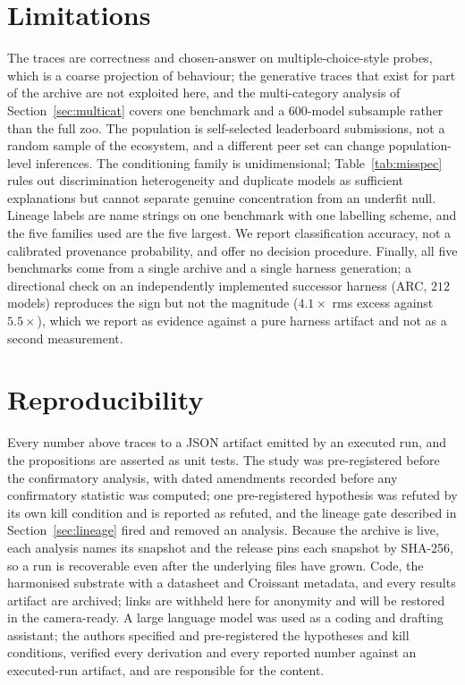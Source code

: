 \documentclass{article}
\begin{document}
\section{Limitations}

The traces are correctness and chosen-answer on multiple-choice-style probes, which is a coarse
projection of behaviour; the generative traces that exist for part of the archive are not exploited
here, and the multi-category analysis of Section~\ref{sec:multicat} covers one benchmark and a
$600$-model subsample rather than the full zoo. The population is self-selected leaderboard submissions, not a random sample
of the ecosystem, and a different peer set can change population-level inferences. The conditioning
family is unidimensional; Table~\ref{tab:misspec} rules out discrimination heterogeneity and
duplicate models as sufficient explanations but cannot separate genuine concentration from an
underfit null. Lineage labels are name strings on one benchmark with one labelling scheme, and the
five families used are the five largest. We report classification accuracy, not a calibrated
provenance probability, and offer no decision procedure. Finally, all five benchmarks come from a
single archive and a single harness generation; a directional check on an independently implemented
successor harness (ARC, $212$ models) reproduces the sign but not the magnitude ($4.1\times$ rms
excess against $5.5\times$), which we report as evidence against a pure harness artifact and not as
a second measurement.

\section{Reproducibility}

Every number above traces to a JSON artifact emitted by an executed run, and the propositions are
asserted as unit tests. The study was pre-registered before the confirmatory analysis, with dated
amendments recorded before any confirmatory statistic was computed; one pre-registered hypothesis
was refuted by its own kill condition and is reported as refuted, and the lineage gate described in
Section~\ref{sec:lineage} fired and removed an analysis. Because the archive is live, each analysis
names its snapshot and the release pins each snapshot by SHA-256, so a run is recoverable even after
the underlying files have grown. Code, the harmonised substrate with a datasheet and Croissant
metadata, and every results artifact are archived; links are withheld here for anonymity and will be
restored in the camera-ready. A large language model was used as a coding and drafting assistant;
the authors specified and pre-registered the hypotheses and kill conditions, verified every
derivation and every reported number against an executed-run artifact, and are responsible for the
content.
\end{document}
